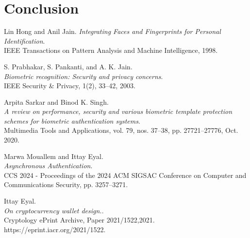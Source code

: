 \documentclass{article}
\begin{document}
\section{Conclusion}
\begin{thebibliography}{9}

Lin Hong and Anil Jain.
\textit{Integrating Faces and Fingerprints for Personal Identification}.\\
IEEE Transactions on Pattern Analysis and Machine Intelligence, 1998.

S. Prabhakar, S. Pankanti, and A. K. Jain.\\
\textit{Biometric recognition: Security and privacy concerns}.\\
IEEE Security \& Privacy, 1(2), 33–42, 2003.

Arpita Sarkar and Binod K. Singh.\\
\textit{A review on performance, security and various biometric template protection schemes for biometric authentication systems}.\\
Multimedia Tools and Applications, vol. 79, nos. 37–38, pp. 27721–27776, Oct. 2020.

Marwa Mouallem and Ittay Eyal.\\
\textit{Asynchronous Authentication}.\\
CCS 2024 - Proceedings of the 2024 ACM SIGSAC Conference on Computer and Communications Security, pp. 3257–3271.

Ittay Eyal.\\
\textit{On cryptocurrency wallet design.}.\\
Cryptology ePrint Archive, Paper 2021/1522,2021. https://eprint.iacr.org/2021/1522.
\end{thebibliography}
\end{document}
